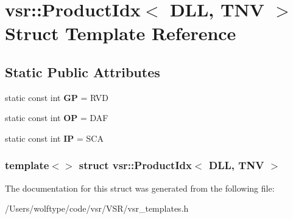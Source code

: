 \hypertarget{structvsr_1_1_product_idx_3_01_d_l_l_00_01_t_n_v_01_4}{\section{vsr\-:\-:Product\-Idx$<$ D\-L\-L, T\-N\-V $>$ Struct Template Reference}
\label{structvsr_1_1_product_idx_3_01_d_l_l_00_01_t_n_v_01_4}
}
\subsection*{Static Public Attributes}
\begin{DoxyCompactItemize}
\item 
\hypertarget{structvsr_1_1_product_idx_3_01_d_l_l_00_01_t_n_v_01_4_ac2020f982689c631f18149cdc73db9f0}{static const int {\bfseries G\-P} = R\-V\-D}\label{structvsr_1_1_product_idx_3_01_d_l_l_00_01_t_n_v_01_4_ac2020f982689c631f18149cdc73db9f0}

\item 
\hypertarget{structvsr_1_1_product_idx_3_01_d_l_l_00_01_t_n_v_01_4_ad671fd000cb13bf6c579ad93ff0f862f}{static const int {\bfseries O\-P} = D\-A\-F}\label{structvsr_1_1_product_idx_3_01_d_l_l_00_01_t_n_v_01_4_ad671fd000cb13bf6c579ad93ff0f862f}

\item 
\hypertarget{structvsr_1_1_product_idx_3_01_d_l_l_00_01_t_n_v_01_4_ab6c35b534bbe51d17e1ccf01b044339a}{static const int {\bfseries I\-P} = S\-C\-A}\label{structvsr_1_1_product_idx_3_01_d_l_l_00_01_t_n_v_01_4_ab6c35b534bbe51d17e1ccf01b044339a}

\end{DoxyCompactItemize}
\subsubsection*{template$<$$>$ struct vsr\-::\-Product\-Idx$<$ D\-L\-L, T\-N\-V $>$}



The documentation for this struct was generated from the following file\-:\begin{DoxyCompactItemize}
\item 
/\-Users/wolftype/code/vsr/\-V\-S\-R/vsr\-\_\-templates.\-h\end{DoxyCompactItemize}
